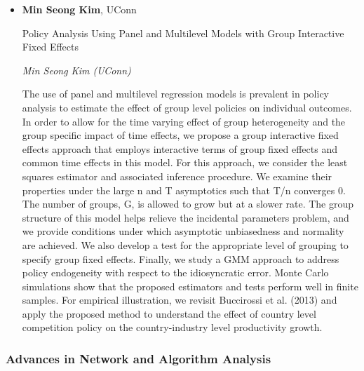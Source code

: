 \begin{itemize}
\item \textbf{Min Seong Kim}, UConn

Policy Analysis Using Panel and Multilevel Models with Group Interactive Fixed Effects

\emph{\footnotesize Min Seong Kim (UConn)}

The use of panel and multilevel regression models is prevalent in policy analysis to estimate the effect of group level policies on individual outcomes. In order to allow for the time varying effect of group heterogeneity and the group specific impact of time effects, we propose a group interactive fixed effects approach that employs interactive terms of group fixed effects and common time effects in this model. For this approach, we consider the least squares estimator and associated inference procedure. We examine their properties under the large n and T asymptotics such that T/n converges 0. The number of groups, G, is allowed to grow but at a slower rate. The group structure of this model helps relieve the incidental parameters problem, and we provide conditions under which asymptotic unbiasedness and normality are achieved. We also develop a test for the appropriate level of grouping to specify group fixed effects. Finally, we study a GMM approach to address policy endogeneity with respect to the idiosyncratic error. Monte Carlo simulations show that the proposed estimators and tests perform well in finite samples. For empirical illustration, we revisit Buccirossi et al. (2013) and apply the proposed method to understand the effect of country level competition policy on the country-industry level productivity growth.

\end{itemize}

\subsubsection*{Advances in Network and Algorithm Analysis}

